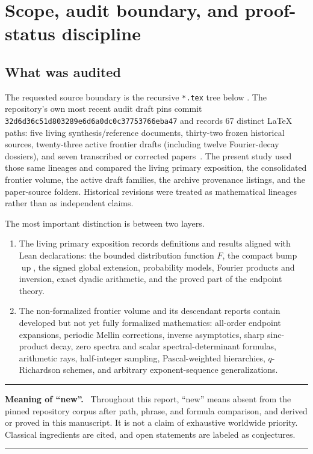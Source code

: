 \documentclass[11pt,oneside]{article}
\theoremstyle{definition}
\newcommand{\Up}{\operatorname{up}}
\newenvironment{statusbox}[1]{%
  \par\medskip\begin{center}\begin{minipage}{0.94\textwidth}%
  \hrule\medskip\textbf{#1.}\ }%
  {\par\medskip\hrule\end{minipage}\end{center}\medskip}
\begin{document}
\tableofcontents
\clearpage

\section{Scope, audit boundary, and proof-status discipline}
\label{sec:audit}

\subsection{What was audited}

The requested source boundary is the recursive \texttt{*.tex} tree below
.  The repository's own most recent audit draft
pins commit \texttt{32d6d36c51d803289e6d6a0dc0c37753766eba47} and records 67
distinct LaTeX paths: five living synthesis/reference documents, thirty-two frozen
historical sources, twenty-three active frontier drafts (including twelve Fourier-decay
dossiers), and seven transcribed or corrected papers~\cite{ReshetnikovRepo}.  The present study used those same lineages and compared the living primary exposition, the consolidated frontier
volume, the active draft families, the archive provenance listings, and the paper-source
folders.  Historical revisions were treated as mathematical lineages rather than as
independent claims.

The most important distinction is between two layers.
\begin{enumerate}[label=(\roman*),leftmargin=2.2em]
\item The living primary exposition records definitions and results aligned with Lean
      declarations: the bounded distribution function \(F\), the compact bump \(\Up\),
      the signed global extension, probability models, Fourier products and inversion,
      exact dyadic arithmetic, and the proved part of the endpoint theory.
\item The non-formalized frontier volume and its descendant reports contain developed
      but not yet fully formalized mathematics: all-order endpoint expansions,
      periodic Mellin corrections, inverse asymptotics, sharp sinc-product decay,
      zero spectra and scalar spectral-determinant formulas, arithmetic rays,
      half-integer sampling, Pascal-weighted hierarchies, \(q\)-Richardson schemes,
      and arbitrary exponent-sequence generalizations.
\end{enumerate}

\begin{statusbox}{Meaning of ``new''}
Throughout this report, ``new'' means absent from the pinned repository corpus after
path, phrase, and formula comparison, and derived or proved in this manuscript.  It is
not a claim of exhaustive worldwide priority.  Classical ingredients are cited, and
open statements are labeled as conjectures.
\end{statusbox}
\end{document}
